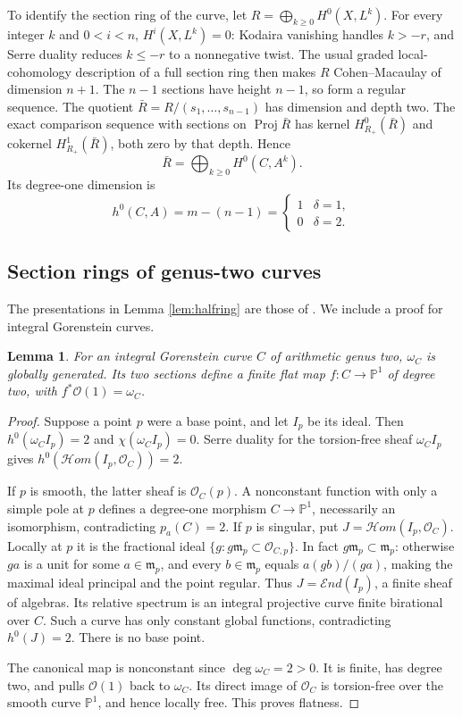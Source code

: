 \documentclass[11pt,reqno,letterpaper]{amsart}
\newcommand{\PP}{\mathbb P}
\newcommand{\Proj}{\operatorname{Proj}}
\newcommand{\OO}{\mathcal O}
\newtheorem{lemma}[theorem]{Lemma}
\theoremstyle{definition}
\numberwithin{equation}{section}
\begin{document}
To identify the section ring of the curve, let $R=\bigoplus_{k\ge0}H^0(X,L^k)$.
For every integer $k$ and $0<i<n$, $H^i(X,L^k)=0$:
Kodaira vanishing handles $k>-r$, and Serre duality reduces $k\le-r$
to a nonnegative twist. The usual graded local-cohomology description
of a full section ring then makes $R$ Cohen--Macaulay of dimension $n+1$.
The $n-1$ sections have height $n-1$, so form a regular sequence.
The quotient $\bar R=R/(s_1,\ldots,s_{n-1})$ has dimension and depth two.
The exact comparison sequence with sections on $\Proj\bar R$ has kernel
$H^0_{R_+}(\bar R)$ and cokernel $H^1_{R_+}(\bar R)$, both zero by that
depth. Hence
\begin{equation}\label{eq:curve-ring}
 \bar R=\bigoplus_{k\ge0}H^0(C,A^k).
\end{equation}
Its degree-one dimension is
\[
 h^0(C,A)=m-(n-1)=
 \begin{cases}1&\delta=1,\\0&\delta=2.\end{cases}
\]

\subsection{Section rings of genus-two curves}\label{sec:curvelemma}
The presentations in Lemma \ref{lem:halfring} are those of
\cite[Proposition 3.2]{fpr}. We include a proof for integral Gorenstein
curves.

\begin{lemma}\label{lem:canonical}
For an integral Gorenstein curve $C$ of arithmetic genus two, $\omega_C$
is globally generated. Its two sections define a finite flat map
$f:C\to\PP^1$ of degree two, with $f^*\OO(1)=\omega_C$.
\end{lemma}
\begin{proof}
Suppose a point $p$ were a base point, and let $I_p$ be its ideal.
Then $h^0(\omega_C I_p)=2$ and $\chi(\omega_C I_p)=0$.
Serre duality for the torsion-free sheaf $\omega_C I_p$ gives
$h^0(\mathcal H om(I_p,\OO_C))=2$.

If $p$ is smooth, the latter sheaf is $\OO_C(p)$.
A nonconstant function with only a simple pole at $p$ defines a
degree-one morphism $C\to\PP^1$, necessarily an isomorphism,
contradicting $p_a(C)=2$.
If $p$ is singular, put $J=\mathcal H om(I_p,\OO_C)$.
Locally at $p$ it is the fractional ideal
$\{g:g\mathfrak m_p\subset\OO_{C,p}\}$.
In fact $g\mathfrak m_p\subset\mathfrak m_p$: otherwise $ga$ is a unit
for some $a\in\mathfrak m_p$, and every $b\in\mathfrak m_p$ equals
$a(gb)/(ga)$, making the maximal ideal principal and the point regular.
Thus $J=\mathcal E nd(I_p)$, a finite sheaf of algebras.
Its relative spectrum is an integral projective curve finite birational
over $C$. Such a curve has only constant global functions, contradicting
$h^0(J)=2$. There is no base point.

The canonical map is nonconstant since $\deg\omega_C=2>0$.
It is finite, has degree two, and pulls $\OO(1)$ back to $\omega_C$.
Its direct image of $\OO_C$ is torsion-free over the smooth curve $\PP^1$,
and hence locally free. This proves flatness.
\end{proof}
\end{document}
